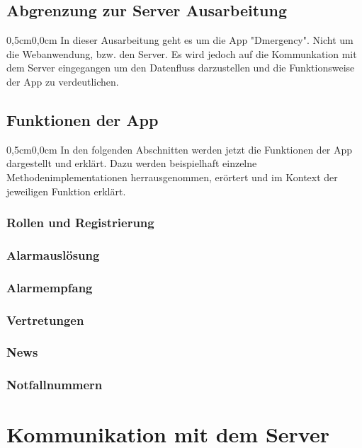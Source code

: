 \documentclass{article}
\begin{document}
\subsection{Abgrenzung zur Server Ausarbeitung}
\begin{changemargin}{0,5cm}{0,0cm}
    In dieser Ausarbeitung geht es um die App "Dmergency". Nicht um die Webanwendung, bzw. den Server.
    Es wird jedoch auf die Kommunkation mit dem Server eingegangen um den Datenfluss darzustellen und die
    Funktionsweise der App zu verdeutlichen. 
\end{changemargin}

\subsection{Funktionen der App}
    \begin{changemargin}{0,5cm}{0,0cm}
        In den folgenden Abschnitten werden jetzt die Funktionen der App dargestellt und erklärt.
        Dazu werden beispielhaft einzelne Methodenimplementationen herrausgenommen, erörtert und
        im Kontext der jeweiligen Funktion erklärt.   
    \end{changemargin}
    \subsubsection{Rollen und Registrierung}
    \subsubsection{Alarmauslösung}
    \subsubsection{Alarmempfang}
    \subsubsection{Vertretungen}
    \subsubsection{News}
    \subsubsection{Notfallnummern}

\section{Kommunikation mit dem Server}
\end{document}
